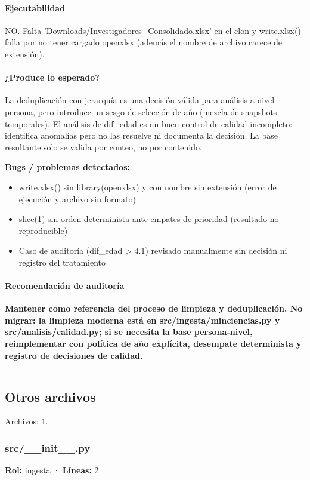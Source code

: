 \paragraph{Ejecutabilidad}
NO. Falta 'Downloads/Investigadores\_Consolidado.xlsx' en el clon y write.xlsx() falla por no tener cargado openxlsx (además el nombre de archivo carece de extensión).

\paragraph{¿Produce lo esperado?}
La deduplicación con jerarquía es una decisión válida para análisis a nivel persona, pero introduce un sesgo de selección de año (mezcla de snapshots temporales). El análisis de dif\_edad es un buen control de calidad incompleto: identifica anomalías pero no las resuelve ni documenta la decisión. La base resultante solo se valida por conteo, no por contenido.

\begin{tcolorbox}[riesgo]
\textbf{Bugs / problemas detectados:}
\begin{itemize}
  \item write.xlsx() sin library(openxlsx) y con nombre sin extensión (error de ejecución y archivo sin formato)
  \item slice(1) sin orden determinista ante empates de prioridad (resultado no reproducible)
  \item Caso de auditoría (dif\_edad > 4.1) revisado manualmente sin decisión ni registro del tratamiento
\end{itemize}
\end{tcolorbox}

\paragraph{Recomendación de auditoría}
\textbf{Mantener como referencia del proceso de limpieza y deduplicación. No migrar: la limpieza moderna está en src/ingesta/minciencias.py y src/analisis/calidad.py; si se necesita la base persona-nivel, reimplementar con política de año explícita, desempate determinista y registro de decisiones de calidad.}

\medskip
\hrule

\subsection{Otros archivos}
\noindent Archivos: 1.

\subsubsection{src/\_\_init\_\_.py}
\textbf{Rol:} ingesta · \textbf{Líneas:} 2

